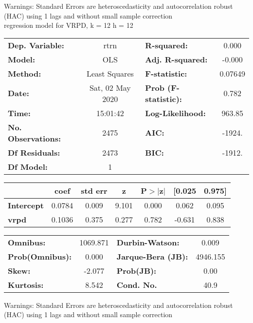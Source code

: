 Warnings: \newline
 [1] Standard Errors are heteroscedasticity and autocorrelation robust (HAC) using 1 lags and without small sample correction\\ 

regression model for VRPD, k = 12 h = 12\begin{center}
\begin{tabular}{lclc}
\toprule
\textbf{Dep. Variable:}    &       rtrn       & \textbf{  R-squared:         } &     0.000   \\
\textbf{Model:}            &       OLS        & \textbf{  Adj. R-squared:    } &    -0.000   \\
\textbf{Method:}           &  Least Squares   & \textbf{  F-statistic:       } &   0.07649   \\
\textbf{Date:}             & Sat, 02 May 2020 & \textbf{  Prob (F-statistic):} &    0.782    \\
\textbf{Time:}             &     15:01:42     & \textbf{  Log-Likelihood:    } &    963.85   \\
\textbf{No. Observations:} &        2475      & \textbf{  AIC:               } &    -1924.   \\
\textbf{Df Residuals:}     &        2473      & \textbf{  BIC:               } &    -1912.   \\
\textbf{Df Model:}         &           1      & \textbf{                     } &             \\
\bottomrule
\end{tabular}
\begin{tabular}{lcccccc}
                   & \textbf{coef} & \textbf{std err} & \textbf{z} & \textbf{P$> |$z$|$} & \textbf{[0.025} & \textbf{0.975]}  \\
\midrule
\textbf{Intercept} &       0.0784  &        0.009     &     9.101  &         0.000        &        0.062    &        0.095     \\
\textbf{vrpd}      &       0.1036  &        0.375     &     0.277  &         0.782        &       -0.631    &        0.838     \\
\bottomrule
\end{tabular}
\begin{tabular}{lclc}
\textbf{Omnibus:}       & 1069.871 & \textbf{  Durbin-Watson:     } &    0.009  \\
\textbf{Prob(Omnibus):} &   0.000  & \textbf{  Jarque-Bera (JB):  } & 4946.155  \\
\textbf{Skew:}          &  -2.077  & \textbf{  Prob(JB):          } &     0.00  \\
\textbf{Kurtosis:}      &   8.542  & \textbf{  Cond. No.          } &     40.9  \\
\bottomrule
\end{tabular}
\end{center}

Warnings: \newline
 [1] Standard Errors are heteroscedasticity and autocorrelation robust (HAC) using 1 lags and without small sample correction\\ 

